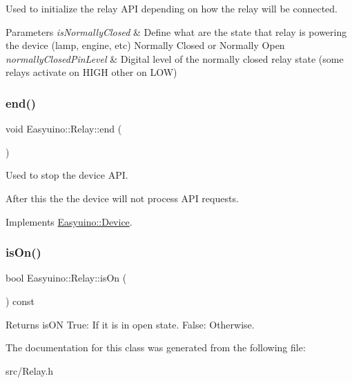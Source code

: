 Used to initialize the relay A\+PI depending on how the relay will be connected. 


\begin{DoxyParams}{Parameters}
{\em is\+Normally\+Closed} & Define what are the state that relay is powering the device (lamp, engine, etc) Normally Closed or Normally Open \\
\hline
{\em normally\+Closed\+Pin\+Level} & Digital level of the normally closed relay state (some relays activate on H\+I\+GH other on L\+OW) \\
\hline
\end{DoxyParams}
\mbox{\label{class_easyuino_1_1_relay_a2b57237c996a6ffe8e900ae273bce9d4}} 
\subsubsection{\texorpdfstring{end()}{end()}}
{\footnotesize\ttfamily void Easyuino\+::\+Relay\+::end (\begin{DoxyParamCaption}{ }\end{DoxyParamCaption})\hspace{0.3cm}{\ttfamily [virtual]}}



Used to stop the device A\+PI. 

After this the the device will not process A\+PI requests. 

Implements \hyperlink{class_easyuino_1_1_device_ab31018ef64adc84aa2ea575b2297548f}{Easyuino\+::\+Device}.

\mbox{\label{class_easyuino_1_1_relay_af8b4ac99e27ffac6c5f8d69d36dc01f5}} 
\subsubsection{\texorpdfstring{is\+On()}{isOn()}}
{\footnotesize\ttfamily bool Easyuino\+::\+Relay\+::is\+On (\begin{DoxyParamCaption}{ }\end{DoxyParamCaption}) const}

\begin{DoxyReturn}{Returns}
is\+ON True\+: If it is in open state. False\+: Otherwise. 
\end{DoxyReturn}


The documentation for this class was generated from the following file\+:\begin{DoxyCompactItemize}
\item 
src/Relay.\+h\end{DoxyCompactItemize}
